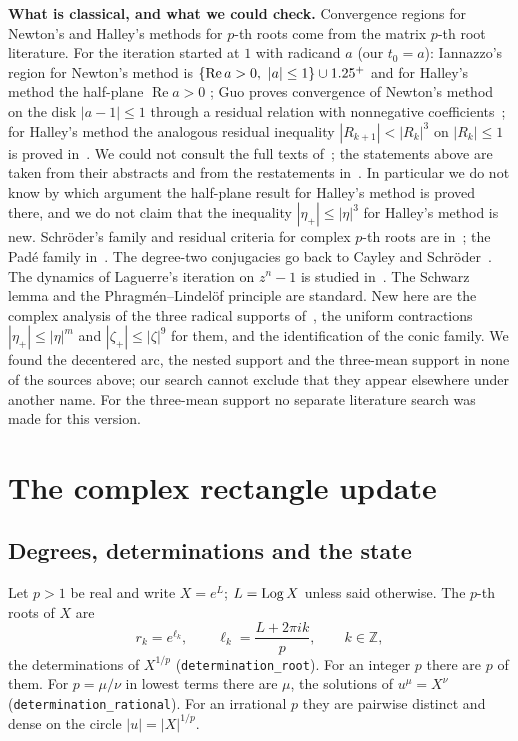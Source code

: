 \documentclass[10pt,a4paper]{article}
\theoremstyle{plain}
\theoremstyle{remark}
\numberwithin{equation}{section}
\DeclareMathOperator{\re}{Re}\DeclareMathOperator{\im}{Im}
\newcommand{\lean}[1]{\texttt{#1}}
\begin{document}
\textbf{What is classical, and what we could check.} Convergence regions for Newton's and Halley's
methods for $p$-th roots come from the matrix $p$-th root literature. For the iteration started at
$1$ with radicand $a$ (our $t_0=a$): Iannazzo's region for Newton's method is
$\{\re a>0,\ |a|\le1\}\cup\R^{+}$ and for Halley's method the half-plane $\re a>0$
\cite{iannazzo06,iannazzo08}; Guo proves convergence of Newton's method on the disk $|a-1|\le1$
through a residual relation with nonnegative coefficients~\cite{guo10}; for Halley's method the
analogous residual inequality $|R_{k+1}|<|R_k|^{3}$ on $|R_k|\le1$ is proved
in~\cite{lin10,kouba}. We could not consult the full texts of~\cite{iannazzo08,guo10}; the
statements above are taken from their abstracts and from the restatements
in~\cite{lz08,higham10,kouba}. In particular we do not know by which argument the half-plane
result for Halley's method is proved there, and we do not claim that the inequality
$|\eta_+|\le|\eta|^{3}$ for Halley's method is new. Schr\"oder's family and residual
criteria for complex $p$-th roots are in~\cite{cardoso11a,cardoso11b}; the Pad\'e family
in~\cite{lz09,gklz12}. The degree-two conjugacies go back to Cayley and
Schr\"oder~\cite{cayley,schroder}. The dynamics of Laguerre's iteration on $z^{n}-1$ is studied
in~\cite{curry,belik}. The Schwarz lemma and the Phragm\'en--Lindel\"of principle are standard.
New here are the complex analysis of the three radical supports of~\cite{v28,v29}, the uniform
contractions $|\eta_+|\le|\eta|^{m}$ and $|\zeta_+|\le|\zeta|^{9}$ for them, and the identification
of the conic family. We found the decentered arc, the nested support and the three-mean support in
none of the sources above; our search cannot exclude that they appear elsewhere under another name.
For the three-mean support no separate literature search was made for this version.

\section{The complex rectangle update}\label{sec:setup}

\subsection{Degrees, determinations and the state}

Let $p>1$ be real and write $X=e^{L}$; $L=\operatorname{Log} X$ unless said otherwise. The $p$-th roots of $X$ are
\[
  r_k=e^{\ell_k},\qquad \ell_k=\frac{L+2\pi i k}{p},\qquad k\in\mathbb{Z},
\]
the determinations of $X^{1/p}$ (\lean{determination\_root}). For an integer $p$ there are $p$ of
them. For $p=\mu/\nu$ in lowest terms there are $\mu$, the solutions of $u^{\mu}=X^{\nu}$
(\lean{determination\_rational}). For an irrational $p$ they are pairwise distinct and dense on the
circle $|u|=|X|^{1/p}$.
\end{document}
